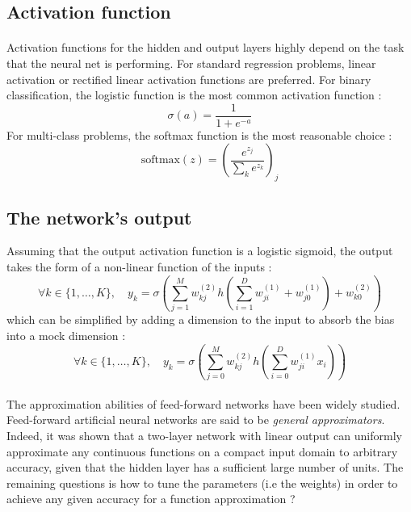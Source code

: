 \documentclass[a4paper]{article}
\begin{document}
{		\subsection{Activation function}
		{
			\paragraph{} Activation functions for the hidden and output layers highly depend on the task that the neural net is performing. For standard regression problems, linear activation or rectified linear activation functions are preferred. For binary classification, the logistic function is the most common activation function : 
			\begin{equation}
				\sigma(a) = \frac{1}{1+e^{-a}}
			\end{equation}
			For multi-class problems, the softmax function is the most reasonable choice : 
			\begin{equation}
				\text{softmax}(z) = \left(\frac{e^{z_j}}{\sum_k e^{z_k}} \right)_j
			\end{equation}
		}
		\subsection{The network's output}
		{
			Assuming that the output activation function is a logistic sigmoid, the output takes the form of a non-linear function of the inputs :  
			\begin{equation}
				\forall{k}\in\{1,\hdots,K\}, \quad y_k = \sigma\left( \sum_{j=1}^M w^{(2)}_{kj}h\left(\sum_{i=1}^D w_{ji}^{(1)} + w_{j0}^{(1)}\right) + w^{(2)}_{k0}\right)
			\end{equation}
			which can be simplified by adding a dimension to the input to absorb the bias into a mock dimension : 
			\begin{equation}
				\forall{k}\in\{1,\hdots,K\}, \quad y_k = \sigma\left( \sum_{j=0}^M w_{kj}^{(2)}h\left(\sum_{i=0}^D w_{ji}^{(1)} x_i\right)\right)
			\end{equation}
			
			\paragraph{} The approximation abilities of feed-forward networks have been widely studied. Feed-forward artificial neural networks are said to be \emph{general approximators}. Indeed, it was shown that a two-layer network with linear output can uniformly approximate any continuous functions on a compact input domain to arbitrary accuracy, given that the hidden layer has a sufficient large number of units. The remaining questions is how to tune the parameters (i.e the weights) in order to achieve any given accuracy for a function approximation ?
		}
	}
	
\end{document}
